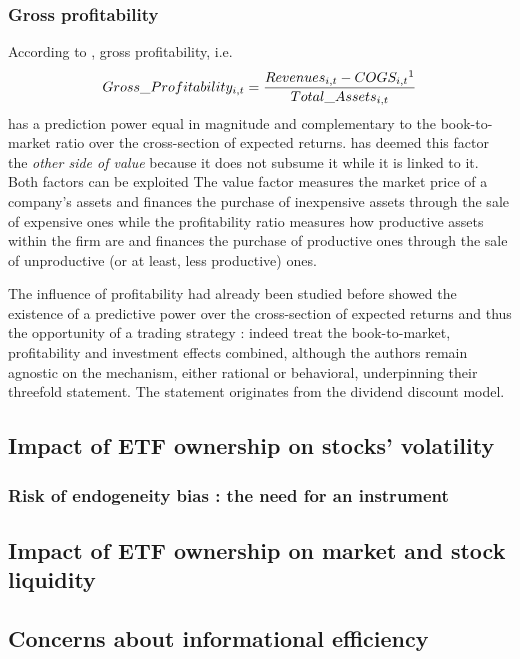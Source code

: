 \subsubsection{Gross profitability}
According to \cite{Novy-Marx2013}, gross profitability, i.e.
\begin{equation}
  Gross\_Profitability_{i, t} = \frac{Revenues_{i, t} - COGS_{i, t}\footnotemark}{Total\_Assets_{i, t}}
\end{equation}
has a prediction power equal in magnitude and complementary to the book-to-market ratio over the cross-section of expected returns. \cite{Novy-Marx2013} has deemed this factor the \emph{other side of value} because it does not subsume it while it is linked to it. Both factors can be exploited The value factor measures the market price of a company's assets and finances the purchase of inexpensive assets through the sale of expensive ones while the profitability ratio measures how productive assets within the firm are and finances the purchase of productive ones through the sale of unproductive (or at least, less productive) ones.

The influence of profitability had already been studied before \cite{Novy-Marx2013} showed the existence of a predictive power over the cross-section of expected returns and thus the opportunity of a trading strategy : indeed \cite{Fama2006} treat the book-to-market, profitability and investment effects combined, although the authors remain agnostic on the mechanism, either rational or behavioral, underpinning their threefold statement. The statement originates from the dividend discount model.
\subsection{Impact of ETF ownership on stocks' volatility}
\label{subsec:Method:Volatility}
\subsubsection{Risk of endogeneity bias : the need for an instrument}
\subsection{Impact of ETF ownership on market and stock liquidity}
\label{subsec:Method:Liquidity}
\subsection{Concerns about informational efficiency}
